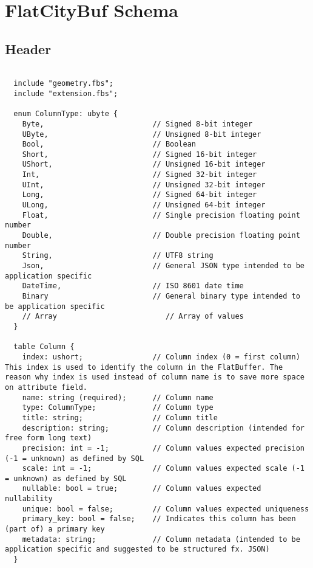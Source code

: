 \chapter{FlatCityBuf Schema}
\label{appendix:flatcitybuf_schema}

\section{Header}
\label{appendix:flatcitybuf_schema:header}
\begin{lstlisting}[caption={Header schema},  basicstyle=\small]

  include "geometry.fbs";
  include "extension.fbs";

  enum ColumnType: ubyte {
    Byte,                         // Signed 8-bit integer
    UByte,                        // Unsigned 8-bit integer
    Bool,                         // Boolean
    Short,                        // Signed 16-bit integer
    UShort,                       // Unsigned 16-bit integer
    Int,                          // Signed 32-bit integer
    UInt,                         // Unsigned 32-bit integer
    Long,                         // Signed 64-bit integer
    ULong,                        // Unsigned 64-bit integer
    Float,                        // Single precision floating point number
    Double,                       // Double precision floating point number
    String,                       // UTF8 string
    Json,                         // General JSON type intended to be application specific
    DateTime,                     // ISO 8601 date time
    Binary                        // General binary type intended to be application specific
    // Array                         // Array of values
  }

  table Column {
    index: ushort;                // Column index (0 = first column) This index is used to identify the column in the FlatBuffer. The reason why index is used instead of column name is to save more space on attribute field.
    name: string (required);      // Column name
    type: ColumnType;             // Column type
    title: string;                // Column title
    description: string;          // Column description (intended for free form long text)
    precision: int = -1;          // Column values expected precision (-1 = unknown) as defined by SQL
    scale: int = -1;              // Column values expected scale (-1 = unknown) as defined by SQL
    nullable: bool = true;        // Column values expected nullability
    unique: bool = false;         // Column values expected uniqueness
    primary_key: bool = false;    // Indicates this column has been (part of) a primary key
    metadata: string;             // Column metadata (intended to be application specific and suggested to be structured fx. JSON)
  }


\end{lstlisting}
